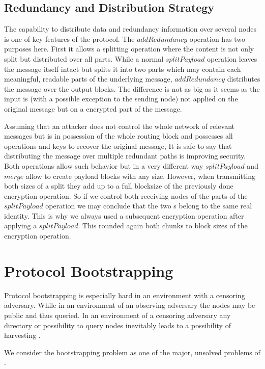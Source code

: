 \section{Redundancy and Distribution Strategy}
The capability to distribute data and redundancy information over several nodes is one of key features of the protocol. The $addRedundancy$ operation has two purposes here. First it allows a splitting operation where the content is not only split but distributed over all parts. While a normal $splitPayload$ operation leaves the message itself intact but splits it into two parts which may contain each meaningful, readable parts of the underlying message, $addRedundancy$ distributes the message over the output blocks. The difference is not as big as it seems as the input is (with a possible exception to the sending node) not applied on the original message but on a encrypted part of the message.

Assuming that an attacker does not control the whole network of relevant messages but is in possession of the whole routing block and possesses all operations and keys to recover the original message, It is safe to say that distributing the message over multiple redundant paths is improving security. Both operations allow such behavior but in a very different way $splitPayload$ and $merge$ allow to create payload blocks with any size. However, when transmitting both sizes of a split they add up to a full blocksize of the previously done encryption operation. So if we control both receiving nodes of the parts of the $splitPayload$ operation we may conclude that the two s belong to the same real identity. This is why we always used a subsequent encryption operation after applying a $splitPayload$. This rounded again both chunks to block sizes of the encryption operation.

\chapter{Protocol Bootstrapping\label{sec:keyDistribution}}
Protocol bootstrapping is especially hard in an environment with a censoring adversary. While in an environment of an observing adversary the nodes may be public and thus queried. In an environment of a censoring adversary any directory or possibility to query nodes inevitably leads to a possibility of harvesting \VortexNodes{}. 

We consider the bootstrapping problem as one of the major, unsolved problems of \MessageVortex.

